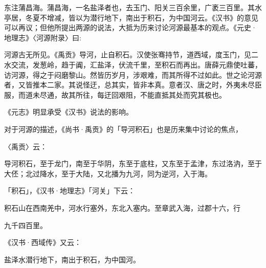\vfill
\begin{BookNotes}
\end{BookNotes}

东注蒲昌海。蒲昌海，一名盐泽者也，去玉门、阳关三百余里，广袤三百里。其水亭居，冬夏不增减，皆以为潜行地下，南出于积石，为中国河云。《汉书》的意见可以再议；但他所提出两源的说法，大抵为历来讨论河源最基本的观点。《元史·地理志》〈河源附录〉曰:

河源古无所见。《禹贡》导河，止自积石。汉使张骞持节，道西域，度玉门，见二水交流，发葱岭，趋于阗，汇盐泽，伏流千里，至积石而再出。唐薛元鼎使吐蕃，访河源，得之于闷磨黎山。然皆历岁月，涉艰难，而其所得不过如此。世之论河源者，又皆推本二家。其说怪迂，总其实，皆非本真。意者汉、唐之时，外夷未尽臣服，而道未尽通，故其所往，每迂回艰阻，不能直抵其处而究其极也。

《元志》明显承受《汉书》说法的影响。


\noindent 对于河源的描述，《尚书·禹贡》的「导河积石」也是历来集中讨论的焦点，

\vfill
\begin{BookNotes}
\end{BookNotes}


\noindent 〈禹贡〉云：

\begin{BookQuote}
导河积石，至于龙门，南至于华阴，东至于底柱，又东至于孟津，东过洛汭，至于大伾；北过降水，至于大陆，又北播为九河，同为逆河，入于海。
\end{BookQuote}

「积石」，《汉书·地理志》「河关」下云：

\begin{BookQuote}
积石山在西南羌中，河水行塞外，东北入塞内。至章武入海，过郡十六，行
\end{BookQuote}

九千四百里。

《汉书·西域传》又云：

\begin{BookQuote}
盐泽水潜行地下，南出于积石，为中国河。
\end{BookQuote}

